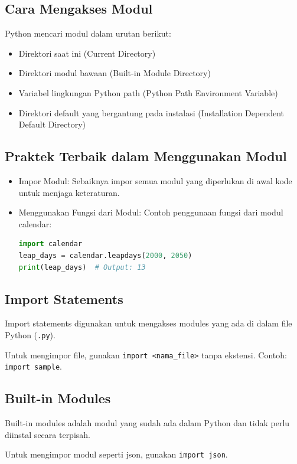 \documentclass{article}
\begin{document}
\subsection{Cara Mengakses Modul}
Python mencari modul dalam urutan berikut:
\begin{itemize}
    \item Direktori saat ini (Current Directory)
    \item Direktori modul bawaan (Built-in Module Directory)
    \item Variabel lingkungan Python path (Python Path Environment Variable)
    \item Direktori default yang bergantung pada instalasi (Installation Dependent Default Directory)
\end{itemize}

\subsection{Praktek Terbaik dalam Menggunakan Modul}
\begin{itemize}
    \item Impor Modul: Sebaiknya impor semua modul yang diperlukan di awal kode untuk menjaga keteraturan.
    \item Menggunakan Fungsi dari Modul: Contoh penggunaan fungsi dari modul calendar:
          \begin{lstlisting}[language=Python, caption={}, captionpos=b]
import calendar
leap_days = calendar.leapdays(2000, 2050)
print(leap_days)  # Output: 13
\end{lstlisting}
\end{itemize}

\subsection{Import Statements}
Import statements digunakan untuk mengakses modules yang ada di dalam file Python (\verb|.py|).

Untuk mengimpor file, gunakan \verb|import <nama_file>| tanpa ekstensi. Contoh: \verb|import sample|.

\subsection{Built-in Modules}
Built-in modules adalah modul yang sudah ada dalam Python dan tidak perlu diinstal secara terpisah.

Untuk mengimpor modul seperti json, gunakan \verb|import json|.
\end{document}
